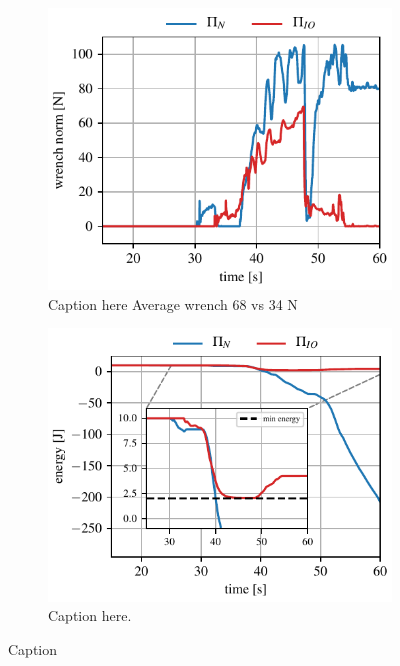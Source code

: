 \begin{figure}[t]
\centering
\hspace*{-0.0cm} 
\begin{subfigure}{0.9\columnwidth}
    \includegraphics[width=\linewidth]{figures/hardware_experiments/wrench_norm.pdf}
    \caption{Caption here Average wrench 68 vs 34 N}
\end{subfigure}
\hspace*{-0.2cm} 
\begin{subfigure}{0.9\columnwidth}
    \includegraphics[width=\linewidth]{figures/hardware_experiments/energy_tank.pdf}
    \caption{Caption here.}
\end{subfigure}
    \caption{Caption}
    \label{fig:passivity_experiment}
\end{figure}

